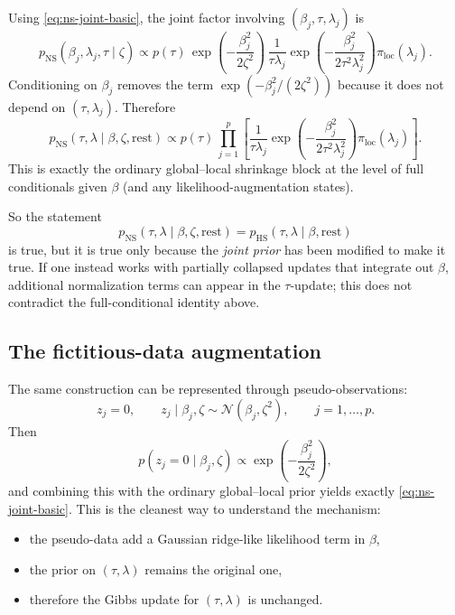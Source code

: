\documentclass[11pt]{article}
\newcommand{\Normal}{\mathcal{N}}
\newcommand{\HS}{\mathrm{HS}}
\newcommand{\NS}{\mathrm{NS}}
\newcommand{\Loc}{\pi_{\mathrm{loc}}}
\begin{document}
Using \eqref{eq:ns-joint-basic}, the joint factor involving $(\beta_j,\tau,\lambda_j)$ is
\[
p_{\NS}(\beta_j,\lambda_j,\tau \mid \zeta)
\propto
p(\tau)\,
\exp\!\left(-\frac{\beta_j^2}{2\zeta^2}\right)\,
\frac{1}{\tau\lambda_j}
\exp\!\left(-\frac{\beta_j^2}{2\tau^2\lambda_j^2}\right)\Loc(\lambda_j).
\]
Conditioning on $\beta_j$ removes the term $\exp(-\beta_j^2/(2\zeta^2))$ because it does not depend on $(\tau,\lambda_j)$. Therefore
\begin{equation}
p_{\NS}(\tau,\lambda \mid \beta,\zeta,\text{rest})
\propto
p(\tau)\,
\prod_{j=1}^p
\left[
\frac{1}{\tau\lambda_j}
\exp\!\left(-\frac{\beta_j^2}{2\tau^2\lambda_j^2}\right)\Loc(\lambda_j)
\right].
\label{eq:ns-block}
\end{equation}
This is exactly the ordinary global--local shrinkage block at the level of full conditionals given $\beta$ (and any likelihood-augmentation states).

So the statement
\[
p_{\NS}(\tau,\lambda \mid \beta,\zeta,\text{rest})
=
p_{\HS}(\tau,\lambda \mid \beta,\text{rest})
\]
is true, but it is true only because the \emph{joint prior} has been modified to make it true. If one instead works with partially collapsed updates that integrate out $\beta$, additional normalization terms can appear in the $\tau$-update; this does not contradict the full-conditional identity above.

\subsection{The fictitious-data augmentation}

The same construction can be represented through pseudo-observations:
\begin{equation}
z_j = 0,
\qquad
z_j \mid \beta_j,\zeta \sim \Normal(\beta_j,\zeta^2),
\qquad j=1,\dots,p.
\label{eq:fictitious-data}
\end{equation}
Then
\[
p(z_j=0 \mid \beta_j,\zeta) \propto \exp\!\left(-\frac{\beta_j^2}{2\zeta^2}\right),
\]
and combining this with the ordinary global--local prior yields exactly \eqref{eq:ns-joint-basic}. This is the cleanest way to understand the mechanism:
\begin{itemize}
\item the pseudo-data add a Gaussian ridge-like likelihood term in $\beta$,
\item the prior on $(\tau,\lambda)$ remains the original one,
\item therefore the Gibbs update for $(\tau,\lambda)$ is unchanged.
\end{itemize}
\end{document}
